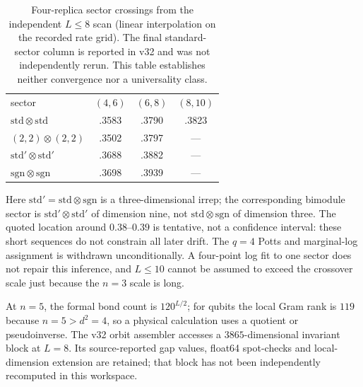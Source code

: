\begin{table}[t]
\caption{Four-replica sector crossings from the independent $L\le8$ scan (linear interpolation on the recorded rate grid). The final standard-sector column is reported in v32 and was not independently rerun. This table establishes neither convergence nor a universality class.}
\label{tab:n4annealed}
\begin{ruledtabular}
\begin{tabular}{lccc}
sector & $(4,6)$ & $(6,8)$ & $(8,10)$\\
\colrule
$\mathrm{std}\otimes\mathrm{std}$ & .3583 & .3790 & .3823\\
$(2,2)\otimes(2,2)$ & .3502 & .3797 & ---\\
$\mathrm{std}'\otimes\mathrm{std}'$ & .3688 & .3882 & ---\\
$\mathrm{sgn}\otimes\mathrm{sgn}$ & .3698 & .3939 & ---\\
\end{tabular}
\end{ruledtabular}
\end{table}

Here $\mathrm{std}'=\mathrm{std}\otimes\mathrm{sgn}$ is a three-dimensional irrep; the corresponding bimodule sector is $\mathrm{std}'\otimes\mathrm{std}'$ of dimension nine, not $\mathrm{std}\otimes\mathrm{sgn}$ of dimension three. The quoted location around $0.38$--$0.39$ is tentative, not a confidence interval: these short sequences do not constrain all later drift. The $q=4$ Potts and marginal-log assignment is withdrawn unconditionally. A four-point log fit to one sector does not repair this inference, and $L\le10$ cannot be assumed to exceed the crossover scale just because the $n=3$ scale is long.

At $n=5$, the formal bond count is $120^{L/2}$; for qubits the local Gram rank is $119$ because $n=5>d^2=4$, so a physical calculation uses a quotient or pseudoinverse. The v32 orbit assembler accesses a $3865$-dimensional invariant block at $L=8$. Its source-reported gap values, float64 spot-checks and local-dimension extension are retained; that block has not been independently recomputed in this workspace.


